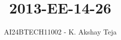 \documentclass[journal,9pt,onecolumn]{IEEEtran}
\begin{document}

\vspace{3cm}
\title{2013-EE-14-26}
\author{AI24BTECH11002 - K. Akshay Teja}
\maketitle
 \bigskip
{\let\newpage\relax\maketitle}

\renewcommand{\thefigure}{\theenumi}
\renewcommand{\thetable}{\theenumi}
\setlength{\intextsep}{10pt} %

\renewcommand{\thetable}{\theenumi}
\end{document}
